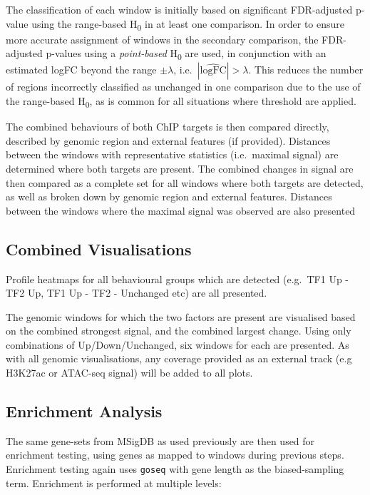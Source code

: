 \documentclass[
]{book}
\begin{document}
The classification of each window is initially based on significant FDR-adjusted p-value using the range-based H\textsubscript{0} in at least one comparison.
In order to ensure more accurate assignment of windows in the secondary comparison, the FDR-adjusted p-values using a \emph{point-based} H\textsubscript{0} are used, in conjunction with an estimated logFC beyond the range \(\pm\lambda\), i.e.~\(|\widehat{\text{logFC}}| > \lambda\).
This reduces the number of regions incorrectly classified as unchanged in one comparison due to the use of the range-based H\textsubscript{0}, as is common for all situations where threshold are applied.

The combined behaviours of both ChIP targets is then compared directly, described by genomic region and external features (if provided).
Distances between the windows with representative statistics (i.e.~maximal signal) are determined where both targets are present.
The combined changes in signal are then compared as a complete set for all windows where both targets are detected, as well as broken down by genomic region and external features.
Distances between the windows where the maximal signal was observed are also presented

\hypertarget{combined-visualisations}{%
\subsection*{Combined Visualisations}\label{combined-visualisations}}

Profile heatmaps for all behavioural groups which are detected (e.g.~TF1 Up - TF2 Up, TF1 Up - TF2 - Unchanged etc) are all presented.

The genomic windows for which the two factors are present are visualised based on the combined strongest signal, and the combined largest change.
Using only combinations of Up/Down/Unchanged, six windows for each are presented.
As with all genomic visualisations, any coverage provided as an external track (e.g H3K27ac or ATAC-seq signal) will be added to all plots.

\hypertarget{enrichment-analysis}{%
\subsection*{Enrichment Analysis}\label{enrichment-analysis}}

The same gene-sets from MSigDB\citep{msigdb} as used previously are then used for enrichment testing, using genes as mapped to windows during previous steps.
Enrichment testing again uses \texttt{goseq} with gene length as the biased-sampling term.
Enrichment is performed at multiple levels:
\end{document}

